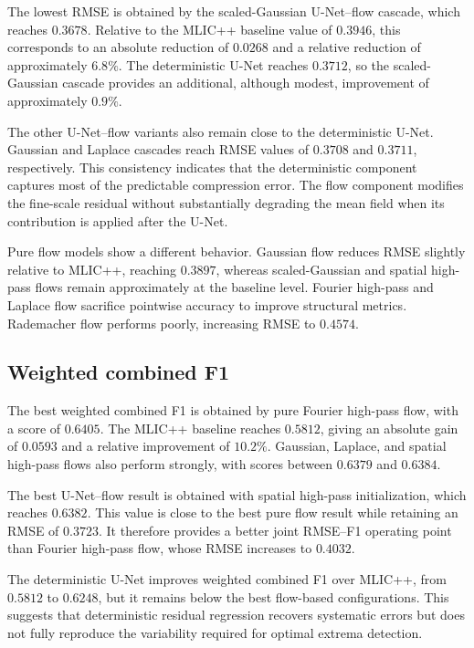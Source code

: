 \documentclass[11pt]{article}
\begin{document}
The lowest RMSE is obtained by the scaled-Gaussian U-Net--flow cascade, which reaches $0.3678$. Relative to the MLIC++ baseline value of $0.3946$, this corresponds to an absolute reduction of $0.0268$ and a relative reduction of approximately $6.8\%$. The deterministic U-Net reaches $0.3712$, so the scaled-Gaussian cascade provides an additional, although modest, improvement of approximately $0.9\%$.

The other U-Net--flow variants also remain close to the deterministic U-Net. Gaussian and Laplace cascades reach RMSE values of $0.3708$ and $0.3711$, respectively. This consistency indicates that the deterministic component captures most of the predictable compression error. The flow component modifies the fine-scale residual without substantially degrading the mean field when its contribution is applied after the U-Net.

Pure flow models show a different behavior. Gaussian flow reduces RMSE slightly relative to MLIC++, reaching $0.3897$, whereas scaled-Gaussian and spatial high-pass flows remain approximately at the baseline level. Fourier high-pass and Laplace flow sacrifice pointwise accuracy to improve structural metrics. Rademacher flow performs poorly, increasing RMSE to $0.4574$.

\subsection{Weighted combined F1}

The best weighted combined F1 is obtained by pure Fourier high-pass flow, with a score of $0.6405$. The MLIC++ baseline reaches $0.5812$, giving an absolute gain of $0.0593$ and a relative improvement of $10.2\%$. Gaussian, Laplace, and spatial high-pass flows also perform strongly, with scores between $0.6379$ and $0.6384$.

The best U-Net--flow result is obtained with spatial high-pass initialization, which reaches $0.6382$. This value is close to the best pure flow result while retaining an RMSE of $0.3723$. It therefore provides a better joint RMSE--F1 operating point than Fourier high-pass flow, whose RMSE increases to $0.4032$.

The deterministic U-Net improves weighted combined F1 over MLIC++, from $0.5812$ to $0.6248$, but it remains below the best flow-based configurations. This suggests that deterministic residual regression recovers systematic errors but does not fully reproduce the variability required for optimal extrema detection.
\end{document}
